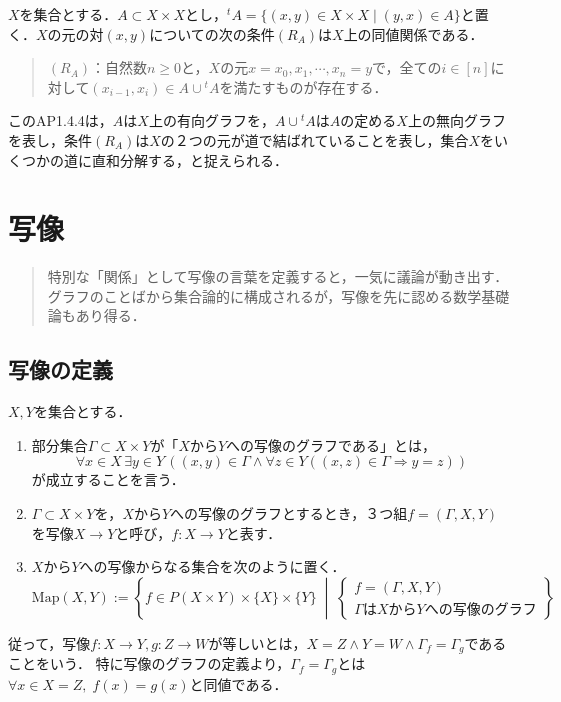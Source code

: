 \documentclass[uplatex,dvipdfmx]{jsreport}
\begin{document}
\begin{problem}[AP1.4.4：部分集合Aによって生成される同値関係]
    $X$を集合とする．$A\subset X\times X$とし，${}^t\!A=\{ (x,y)\in X\times X\mid(y,x)\in A\}$と置く．$X$の元の対$(x,y)$についての次の条件$(R_A)$は$X$上の同値関係である．
    \begin{quote}
        $(R_A)$：自然数$n\ge 0$と，$X$の元$x=x_0,x_1,\cdots,x_n=y$で，全ての$i\in [n]$に対して$(x_{i-1},x_i)\in A\cup {}^t\!A$を満たすものが存在する．
    \end{quote}
\end{problem}
\begin{remark}
    このAP1.4.4は，$A$は$X$上の有向グラフを，$A\cup {}^t\!A$は$A$の定める$X$上の無向グラフを表し，条件$(R_A)$は$X$の２つの元が道で結ばれていることを表し，集合$X$をいくつかの道に直和分解する，と捉えられる．
\end{remark}

\chapter{写像}

\begin{quotation}
    特別な「関係」として写像の言葉を定義すると，一気に議論が動き出す．
    グラフのことばから集合論的に構成されるが，写像を先に認める数学基礎論もあり得る．
\end{quotation}

\section{写像の定義}

\begin{definition}[mapping]$X,Y$を集合とする．
    \begin{enumerate}
        \item 部分集合$\Gamma\subset X\times Y$が「$X$から$Y$への写像のグラフである」とは，\[\forall x\in X\, \exists y\in Y \, ((x,y)\in\Gamma\wedge \forall z\in Y((x,z)\in\Gamma\Rightarrow y=z))\]が成立することを言う．
        \item $\Gamma\subset X\times Y$を，$X$から$Y$への写像のグラフとするとき，３つ組$f=(\Gamma,X,Y)$を写像$X\to Y$と呼び，$f:X\to Y$と表す．
        \item $X$から$Y$への写像からなる集合を次のように置く．
        \[\mathrm{Map}(X,Y):=\left\{ f\in P(X\times Y)\times \{ X\}\times\{ Y\} \;\middle|\; \begin{cases}
            f=(\Gamma,X,Y)\\
            \Gamma はXからYへの写像のグラフ
        \end{cases}\right\}\]
    \end{enumerate}
\end{definition}
従って，写像$f:X\to Y,g:Z\to W$が等しいとは，$X=Z\land Y=W\land \Gamma_f=\Gamma_g$であることをいう．
特に写像のグラフの定義より，$\Gamma_f=\Gamma_g$とは$\forall x\in X=Z,\;f(x)=g(x)$と同値である．
\end{document}
